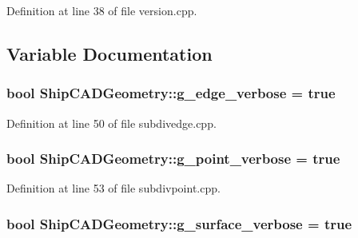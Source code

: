 Definition at line 38 of file version.\-cpp.



\subsection{Variable Documentation}
\hypertarget{namespaceShipCADGeometry_a7292a1f721ae22250d2cce1f1d8c1b6e}{
\subsubsection[{g\-\_\-edge\-\_\-verbose}]{\setlength{\rightskip}{0pt plus 5cm}bool Ship\-C\-A\-D\-Geometry\-::g\-\_\-edge\-\_\-verbose = true}}\label{namespaceShipCADGeometry_a7292a1f721ae22250d2cce1f1d8c1b6e}


Definition at line 50 of file subdivedge.\-cpp.

\hypertarget{namespaceShipCADGeometry_ac9b4ad824e0afa8d19c8a11f3947804d}{
\subsubsection[{g\-\_\-point\-\_\-verbose}]{\setlength{\rightskip}{0pt plus 5cm}bool Ship\-C\-A\-D\-Geometry\-::g\-\_\-point\-\_\-verbose = true}}\label{namespaceShipCADGeometry_ac9b4ad824e0afa8d19c8a11f3947804d}


Definition at line 53 of file subdivpoint.\-cpp.

\hypertarget{namespaceShipCADGeometry_a8582b9000c1e02427db76565fdd88e4b}{
\subsubsection[{g\-\_\-surface\-\_\-verbose}]{\setlength{\rightskip}{0pt plus 5cm}bool Ship\-C\-A\-D\-Geometry\-::g\-\_\-surface\-\_\-verbose = true}}\label{namespaceShipCADGeometry_a8582b9000c1e02427db76565fdd88e4b}


